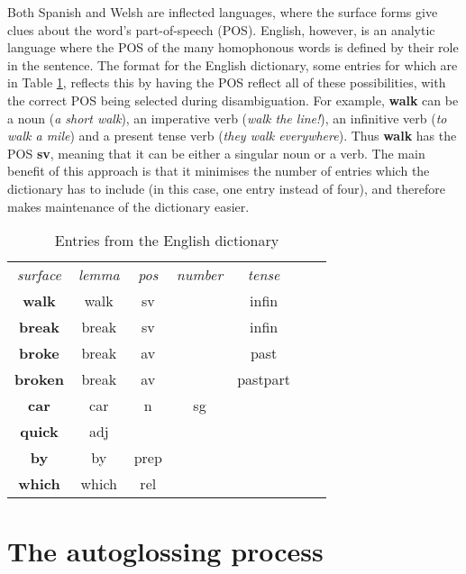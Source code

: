 \documentclass[11pt]{article}
\begin{document}
Both Spanish and Welsh are inflected languages, where the surface forms give clues about the word's part-of-speech (POS).  English, however, is an analytic language where the POS of the many homophonous words is defined by their role in the sentence.  The format for the English dictionary, some entries for which are in Table \ref{english_dict}, reflects this by having the POS reflect all of these possibilities, with the correct POS being selected during disambiguation.  For example, \textbf{walk} can be a noun (\textit{a short walk}), an imperative verb (\textit{walk the line!}), an infinitive verb (\textit{to walk a mile}) and a present tense verb (\textit{they walk everywhere}).  Thus \textbf{walk} has the POS \textbf{sv}, meaning that it can be either a singular noun or a verb. The main benefit of this approach is that it minimises the number of entries which the dictionary has to include (in this case, one entry instead of four), and therefore makes maintenance of the dictionary easier.

\begin{table}[!hbtp]
\centering
\begin{scriptsize}
\begin{tabular}{ccccccc}
\textit{surface} & \textit{lemma} & \textit{pos} & \textit{number} & \textit{tense} \\
\textbf{walk} & walk & sv & & infin \\
\textbf{break} & break & sv & & infin \\
\textbf{broke} & break & av & & past \\
\textbf{broken} & break & av & & pastpart \\
\textbf{car} & car & n & sg & \\
\textbf{quick} & adj & & & \\
\textbf{by} & by & prep & & \\
\textbf{which} & which & rel & & \\
\end{tabular}
\end{scriptsize}
\caption{Entries from the English dictionary}
\label{english_dict}
\end{table}


\section{The autoglossing process}
\label{sec:autoglosser}
\end{document}
